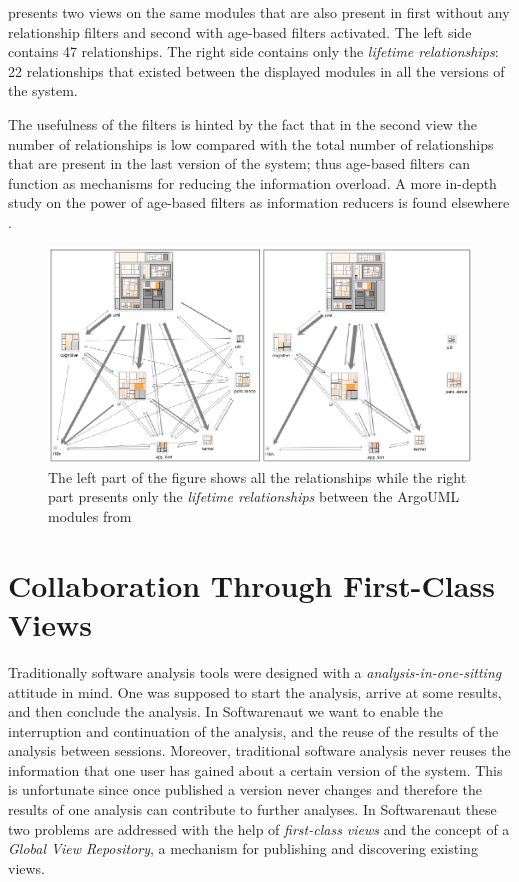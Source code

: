 \documentclass[preprint,12pt]{elsarticle}
\begin{document}
 presents two views on the same modules that are also present in  first without any relationship filters and second with age-based filters activated. The left side contains 47 relationships. The right side contains only the {\em lifetime relationships}: 22 relationships that existed between the displayed modules in all the versions of the system. 

The usefulness of the filters is hinted by the fact that in the second view the number of relationships is low compared with the total number of relationships that are present in the last version of the system; thus age-based filters can function as mechanisms for reducing the information overload. A more in-depth study on the power of age-based filters as information reducers is found elsewhere \cite{lungu-relevo}.

\begin{figure}
\begin{center}
\includegraphics[width=\linewidth]{Architecture-LifetimeVsRecent}
\caption{The left part of the figure shows all the relationships while the right part presents only the {\em lifetime relationships} between the ArgoUML modules from }
\end{center}
\end{figure}

\section {Collaboration Through First-Class Views} 

Traditionally software analysis tools were designed with a {\em analysis-in-one-sitting} attitude  in mind. One was supposed to start the analysis, arrive at some results, and then conclude the analysis. In Softwarenaut we want to enable the interruption and continuation of the analysis, and the reuse of the results of the analysis between sessions. Moreover, traditional software analysis never reuses the information that one user has gained about a certain version of the system. This is {unfortunate} since once published a version never changes and therefore the results of one analysis can {contribute to} further analyses. In Softwarenaut these two problems are addressed with the help of {\em first-class views} and the concept of a {\em Global View Repository}, a mechanism for publishing and discovering existing views.
\end{document}

